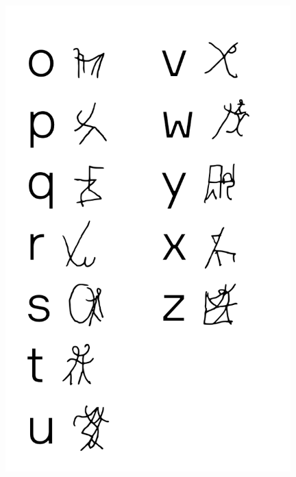 \makeatletter\@openrightfalse
\begin{absolutelynopagebreak}
\begin{vplace}
\begin{figure}[H]
\begin{adjustwidth}{-0.99cm}{}
  \centering
  \vspace*{-2cm}
  \hspace*{0.4cm}
  \includegraphics[width=110mm]{./imgs/alfa2.pdf}  
  \hfill
\end{adjustwidth}

\thispagestyle{empty}

\end{figure}
\end{vplace}

\end{absolutelynopagebreak}

